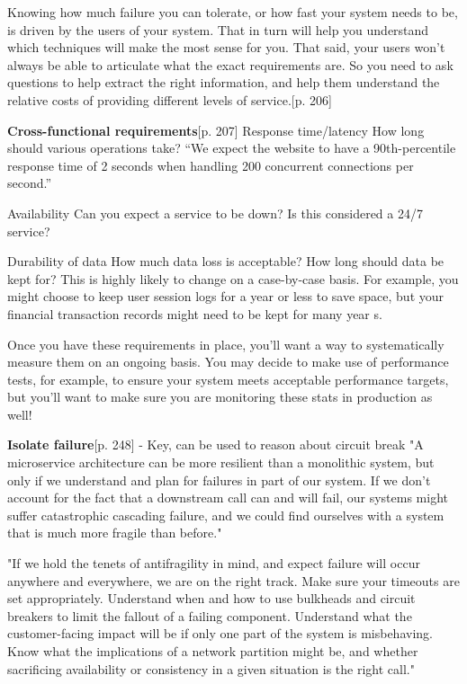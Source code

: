 Knowing how much failure you can tolerate, or how fast your system needs to be, is driven by the users of your system. That in turn will help you understand which techniques will make the most sense for you. That said, your users won’t always be able to articulate what the exact requirements are. So you need to ask questions to help extract the right information, and help them understand the relative costs of providing different levels of service.\cite{newman2015microservices}[p. 206]


\textbf{Cross-functional requirements}\cite{newman2015microservices}[p. 207]
Response time/latency
	How long should various operations take?
	“We expect the website to have a 90th-percentile response time of 2 seconds when handling 200 concurrent connections per second.”


Availability
	Can you expect a service to be down? Is this considered a 24/7 service?


Durability of data
	How much data loss is acceptable? How long should data be kept for? This is highly likely to change on a case-by-case basis. For example, you might choose to keep user session logs for a year or less to save space, but your financial transaction records might need to be kept for many year s.
	
	
Once you have these requirements in place, you’ll want a way to systematically measure them on an ongoing basis. You may decide to make use of performance tests, for example, to ensure your system meets acceptable performance targets, but you’ll want to make sure you are monitoring these stats in production as well!


\textbf{Isolate failure}\cite{newman2015microservices}[p. 248]  - Key, can be used to reason about circuit break
"A microservice architecture can be more resilient than a monolithic system, but only if we understand and plan for failures in part of our system. If we don’t account for the fact that a downstream call can and will fail, our systems might suffer catastrophic cascading failure, and we could find ourselves with a system that is much more fragile than before."


"If we hold the tenets of antifragility in mind, and expect failure will occur anywhere and everywhere, we are on the right track. Make sure your timeouts are set appropriately. Understand when and how to use bulkheads and circuit breakers to limit the fallout of a failing component. Understand what the customer-facing impact will be if only one part of the system is misbehaving. Know what the implications of a network partition might be, and whether sacrificing availability or consistency in a given situation is the right call."

